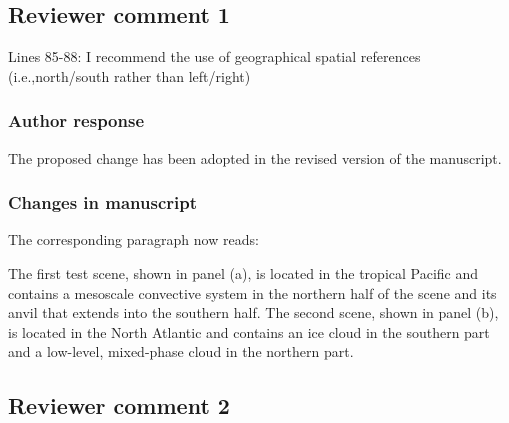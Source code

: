 \documentclass[11pt]{scrartcl}
\providecommand{\DIFadd}[1]{{\protect\textcolor{blue}{\uwave{#1}}}} %
\providecommand{\DIFdel}[1]{{\protect\textcolor{red}{\sout{#1}}}}                      %
\providecommand{\DIFaddbegin}{} %
\providecommand{\DIFaddend}{} %
\providecommand{\DIFdelbegin}{} %
\providecommand{\DIFdelend}{} %
\newenvironment{change}[1][]{%
  \begin{mdframed}[frametitle={Line #1:}]%
}{%
  \end{mdframed}%
}
\begin{document}
\begin{itemize}
\subsection*{Reviewer comment 1}
Lines 85-88: I recommend the use of geographical spatial references
(i.e.,north/south rather than left/right)

\subsubsection*{Author response}

The proposed change has been adopted in the revised version of the manuscript.

\subsubsection*{Changes in manuscript}

The corresponding paragraph now reads:

\begin{mdframed}[style=change]
 The first test scene, shown in panel (a), is located in the tropical Pacific
 and contains a mesoscale convective system in the northern half of the scene
 and its anvil that extends into the southern half. The second scene, shown in
 panel (b), is located in the North Atlantic and contains an ice cloud in the
 southern part and a low-level, mixed-phase cloud in the northern part.
\end{mdframed}

%


\subsection*{Reviewer comment 2}


\end{itemize}
\end{document}
